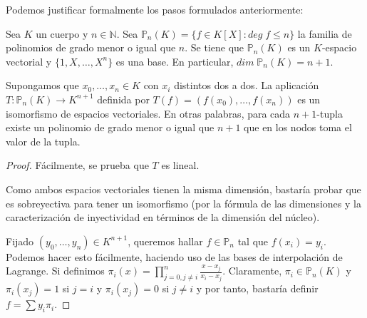 Podemos justificar formalmente los pasos formulados anteriormente:

Sea $K$ un cuerpo y $n \in \mathbb{N}$. Sea $\mathbb{P}_n(K) = \{f \in K[X]: deg \; f \le n \}$ la familia de polinomios de grado menor o igual que $n$. Se tiene que $\mathbb{P}_n(K)$ es un $K$-espacio vectorial y $\{1,X,\ldots,X^n\}$ es una base. En particular, $dim \; \mathbb{P}_n(K) = n+1$. 

\begin{proposition}
Supongamos que $x_0,\ldots,x_n \in K$ con $x_i$ distintos dos a dos. La aplicación $T:\mathbb{P}_n(K) \to K^{n+1}$ definida por $T(f) = (f(x_0),\ldots,f(x_n))$ es un isomorfismo de espacios vectoriales. En otras palabras, para cada $n+1$-tupla existe un polinomio de grado menor o igual que $n+1$ que en los nodos toma el valor de la tupla. 
\end{proposition}
\begin{proof}
Fácilmente, se prueba que $T$ es lineal. 

Como ambos espacios vectoriales tienen la misma dimensión, bastaría probar que es sobreyectiva para tener un isomorfismo (por la fórmula de las dimensiones y la caracterización de inyectividad en términos de la dimensión del núcleo). 

Fijado $(y_0,\ldots,y_n) \in K^{n+1}$, queremos hallar $f \in \mathbb{P}_n$ tal que $f(x_i) = y_i$. Podemos hacer esto fácilmente, haciendo uso de las bases de interpolación de Lagrange. Si definimos $\pi_i(x) = \prod_{j = 0,j \neq i}^n \frac{x-x_j}{x_i-x_j}$. Claramente, $\pi_i \in \mathbb{P}_n(K)$ y $\pi_i(x_j) = 1$ si $j = i$ y $\pi_i(x_j) = 0$ si $j \neq i$ y por tanto, bastaría definir $f = \sum y_i \pi_i$. 
\end{proof}

